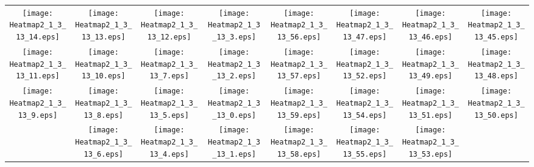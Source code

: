 \documentclass{standalone}
\begin{document}
\begin{tabular}{ *8{c} }
\texttt{[image: Heatmap2\_1\_3\_13\_14.eps]} & \texttt{[image: Heatmap2\_1\_3\_13\_13.eps]} & \texttt{[image: Heatmap2\_1\_3\_13\_12.eps]} & \texttt{[image: Heatmap2\_1\_3\_13\_3.eps]} & \texttt{[image: Heatmap2\_1\_3\_13\_56.eps]} & \texttt{[image: Heatmap2\_1\_3\_13\_47.eps]} & \texttt{[image: Heatmap2\_1\_3\_13\_46.eps]} & \texttt{[image: Heatmap2\_1\_3\_13\_45.eps]} \\
\texttt{[image: Heatmap2\_1\_3\_13\_11.eps]} & \texttt{[image: Heatmap2\_1\_3\_13\_10.eps]} & \texttt{[image: Heatmap2\_1\_3\_13\_7.eps]} & \texttt{[image: Heatmap2\_1\_3\_13\_2.eps]} & \texttt{[image: Heatmap2\_1\_3\_13\_57.eps]} & \texttt{[image: Heatmap2\_1\_3\_13\_52.eps]} & \texttt{[image: Heatmap2\_1\_3\_13\_49.eps]} & \texttt{[image: Heatmap2\_1\_3\_13\_48.eps]} \\
\texttt{[image: Heatmap2\_1\_3\_13\_9.eps]} & \texttt{[image: Heatmap2\_1\_3\_13\_8.eps]} & \texttt{[image: Heatmap2\_1\_3\_13\_5.eps]} & \texttt{[image: Heatmap2\_1\_3\_13\_0.eps]} & \texttt{[image: Heatmap2\_1\_3\_13\_59.eps]} & \texttt{[image: Heatmap2\_1\_3\_13\_54.eps]} & \texttt{[image: Heatmap2\_1\_3\_13\_51.eps]} & \texttt{[image: Heatmap2\_1\_3\_13\_50.eps]} \\
 & \texttt{[image: Heatmap2\_1\_3\_13\_6.eps]} & \texttt{[image: Heatmap2\_1\_3\_13\_4.eps]} & \texttt{[image: Heatmap2\_1\_3\_13\_1.eps]} & \texttt{[image: Heatmap2\_1\_3\_13\_58.eps]} & \texttt{[image: Heatmap2\_1\_3\_13\_55.eps]} & \texttt{[image: Heatmap2\_1\_3\_13\_53.eps]} &  
\end{tabular}
\end{document}
